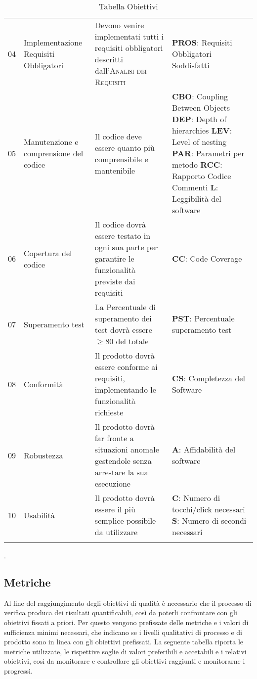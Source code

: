 \begin{longtable}{ 
		>{}p{} 
		>{}p{}
        >{}p{}
        >{\centering}p{} }
        04 & Implementazione Requisiti Obbligatori & Devono venire implementati tutti i requisiti obbligatori descritti dall'\textsc{Analisi dei Requisiti} & \textbf{PROS}: Requisiti Obbligatori Soddisfatti \tabularnewline

        05 & Manutenzione e comprensione del codice & Il codice deve essere quanto più comprensibile e mantenibile & \textbf{CBO}: Coupling Between Objects \newline \textbf{DEP}: Depth of hierarchies \newline \textbf{LEV}: Level of nesting \newline \textbf{PAR}: Parametri per metodo \newline \textbf{RCC}: Rapporto Codice Commenti \newline \textbf{L}: Leggibilità del software \tabularnewline

        06 & Copertura del codice & Il codice dovrà essere testato in ogni sua parte per garantire le funzionalità previste dai requisiti & \textbf{CC}: Code Coverage \tabularnewline

        07 & Superamento test & La Percentuale di superamento dei test dovrà essere $\geq 80$ del totale & \textbf{PST}: Percentuale superamento test \tabularnewline

        08 & Conformità & Il prodotto dovrà essere conforme ai requisiti, implementando le funzionalità richieste & \textbf{CS}: Completezza del Software \tabularnewline

        09 & Robustezza & Il prodotto dovrà far fronte a situazioni anomale gestendole senza arrestare la sua esecuzione & \textbf{A}: Affidabilità del software \tabularnewline

        10 & Usabilità & Il prodotto dovrà essere il più semplice possibile da utilizzare & \textbf{C}: Numero di tocchi/click necessari \newline \textbf{S}: Numero di secondi necessari\tabularnewline
        \caption{Tabella Obiettivi}
    \end{longtable}.



\subsection{Metriche}
Al fine del raggiungimento degli obiettivi di qualità è necessario che il processo di verifica produca dei risultati quantificabili, così da poterli confrontare con gli obiettivi fissati a priori. Per questo vengono prefissate delle metriche e i valori di sufficienza minimi necessari, che indicano se i livelli qualitativi di processo e di prodotto sono in linea con gli obiettivi prefissati. La seguente tabella riporta le metriche utilizzate, le rispettive soglie di valori preferibili e accetabili e i relativi obiettivi, così da monitorare e controllare gli obiettivi raggiunti e monitorarne i progressi.

